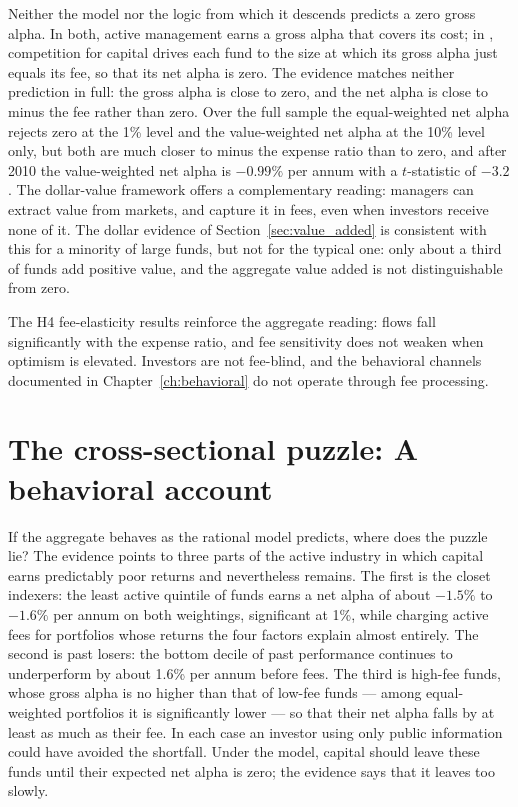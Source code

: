 \documentclass[12pt, oneside]{report}
\begin{document}
Neither the \textcite{BerkGreen2004} model nor the
\textcite{GrossmanStiglitz1980} logic from which it descends predicts a
zero gross alpha. In both, active management earns a gross alpha that
covers its cost; in \textcite{BerkGreen2004}, competition for capital
drives each fund to the size at which its gross alpha just equals its
fee, so that its net alpha is zero. The evidence matches neither
prediction in full: the gross alpha is close to zero, and the net alpha
is close to minus the fee rather than zero. Over the full sample 
the equal-weighted net alpha rejects zero at the 1\%
level and the value-weighted net alpha at the 10\% level only, but both
are much closer to minus the expense ratio than to zero, and after 2010
the value-weighted net alpha is $-0.99\%$ per annum with a $t$-statistic
of $-3.2$. The \textcite{BerkVanBinsbergen2015} dollar-value framework
offers a complementary reading: managers can extract value from markets,
and capture it in fees, even when investors receive none of it. The
dollar evidence of Section~\ref{sec:value_added} is consistent with this
for a minority of large funds, but not for the typical one: only about a
third of funds add positive value, and the aggregate value added is not
distinguishable from zero.

The H4 fee-elasticity results reinforce the aggregate reading: flows fall
significantly with the expense ratio, and fee sensitivity does not weaken
when optimism is elevated. Investors are not fee-blind, and the
behavioral channels documented in Chapter~\ref{ch:behavioral} do not
operate through fee processing.

\section{The cross-sectional puzzle: A behavioral account}
\label{sec:behavioral_cross_section}

\noindent If the aggregate behaves as the rational model predicts, where
does the puzzle lie? The evidence points to three parts of the active
industry in which capital earns predictably poor returns and nevertheless
remains. The first is the closet indexers: the least active quintile of
funds earns a net alpha of about $-1.5\%$ to $-1.6\%$ per annum on both weightings,
significant at 1\%, while charging active fees for portfolios whose
returns the four factors explain almost entirely. The second is past
losers: the bottom decile of past performance continues to underperform
by about 1.6\% per annum before fees. The third is high-fee funds, whose
gross alpha is no higher than that of low-fee funds --- among
equal-weighted portfolios it is significantly lower --- so that their net
alpha falls by at least as much as their fee. In each case an investor
using only public information could have avoided the shortfall. Under the
\textcite{BerkGreen2004} model, capital should leave these funds until
their expected net alpha is zero; the evidence says that it leaves too
slowly.
\end{document}
